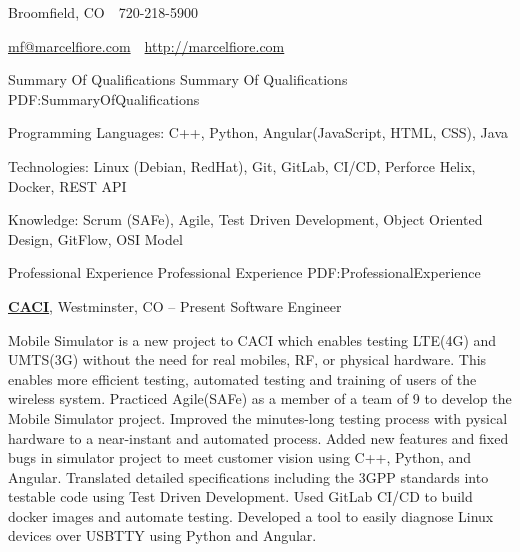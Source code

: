 \documentclass[letterpaper,MMMyyyy,nonstopmode]{simpleresumecv}
\newcommand{\CVAuthor}{Marcel Fiore}
\newcommand{\CVWebpage}{http://marcelfiore.com}
\begin{document}

\Title{\CVAuthor}

\begin{SubTitle}
Broomfield, CO
\,\SubBulletSymbol\,
720-218-5900
\par
\href{mailto:mf@marcelfiore.com}{mf@marcelfiore.com}
\,\SubBulletSymbol\,
\href{\CVWebpage}
{\url{\CVWebpage}}
\end{SubTitle}

\begin{Body}


\Section
{Summary Of Qualifications}
{Summary Of Qualifications}
{PDF:SummaryOfQualifications}

\BulletItem Programming Languages: C++, Python, Angular(JavaScript, HTML, CSS), Java

\Gap
\BulletItem Technologies: Linux (Debian, RedHat), Git, GitLab, CI/CD, Perforce Helix, Docker, REST API

\Gap
\BulletItem Knowledge: Scrum (SAFe), Agile, Test Driven Development, Object Oriented Design, GitFlow, OSI Model



\Section
{Professional Experience}
{Professional Experience}
{PDF:ProfessionalExperience}

\Entry
\href{https://www.caci.com/}{\textbf{CACI}},  Westminster, CO
\hfill
{} --
Present
\BulletItem Software Engineer
\begin{Detail}
Mobile Simulator is a new project to CACI which enables testing LTE(4G) and UMTS(3G) without the need for real mobiles, RF, or physical hardware. This enables more efficient testing, automated testing and training of users of the wireless system.
\SubBulletItem Practiced Agile(SAFe) as a member of a team of 9 to develop the Mobile Simulator project.
\SubBulletItem Improved the minutes-long testing process with pysical hardware to a near-instant and automated process.
\SubBulletItem Added new features and fixed bugs in simulator project to meet customer vision using C++, Python, and Angular.
\SubBulletItem Translated detailed specifications including the 3GPP standards into testable code using Test Driven Development.
\SubBulletItem Used GitLab CI/CD to build docker images and automate testing.
\SubBulletItem Developed a tool to easily diagnose Linux devices over USBTTY using Python and Angular.
\end{Detail}


\end{Body}
\end{document}
